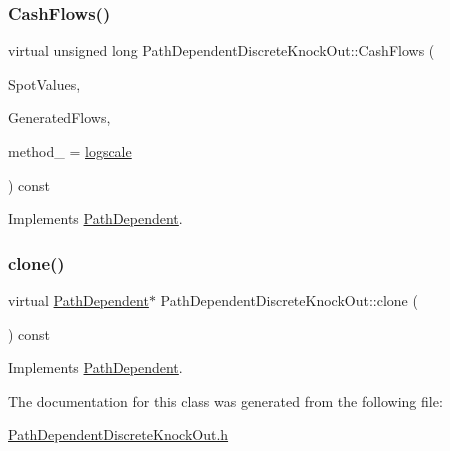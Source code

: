\subsubsection{\texorpdfstring{Cash\+Flows()}{CashFlows()}}
{\footnotesize\ttfamily virtual unsigned long Path\+Dependent\+Discrete\+Knock\+Out\+::\+Cash\+Flows (\begin{DoxyParamCaption}\item[{const \hyperlink{classMJArray}{M\+J\+Array} \&}]{Spot\+Values,  }\item[{std\+::vector$<$ \hyperlink{classMyCashFlow_1_1CashFlow}{My\+Cash\+Flow\+::\+Cash\+Flow} $>$ \&}]{Generated\+Flows,  }\item[{\hyperlink{PathDependent_8h_abed946c62f140eb7ff2ac742e6ad9497}{method}}]{method\+\_\+ = {\ttfamily \hyperlink{PathDependent_8h_abed946c62f140eb7ff2ac742e6ad9497a064d3d3358889658ce07fe9f3191d1fd}{logscale}} }\end{DoxyParamCaption}) const\hspace{0.3cm}{\ttfamily [virtual]}}



Implements \hyperlink{classPathDependent_a5d5b1d6ecf9dc6be128fff9694f589c8}{Path\+Dependent}.

\hypertarget{classPathDependentDiscreteKnockOut_a5e3b89d4d9eabff48ca28f84c3625151}{}\label{classPathDependentDiscreteKnockOut_a5e3b89d4d9eabff48ca28f84c3625151} 
\subsubsection{\texorpdfstring{clone()}{clone()}}
{\footnotesize\ttfamily virtual \hyperlink{classPathDependent}{Path\+Dependent}$\ast$ Path\+Dependent\+Discrete\+Knock\+Out\+::clone (\begin{DoxyParamCaption}{ }\end{DoxyParamCaption}) const\hspace{0.3cm}{\ttfamily [virtual]}}



Implements \hyperlink{classPathDependent_afcc10647f591175642c6dc0adba23f0b}{Path\+Dependent}.



The documentation for this class was generated from the following file\+:\begin{DoxyCompactItemize}
\item 
\hyperlink{PathDependentDiscreteKnockOut_8h}{Path\+Dependent\+Discrete\+Knock\+Out.\+h}\end{DoxyCompactItemize}
